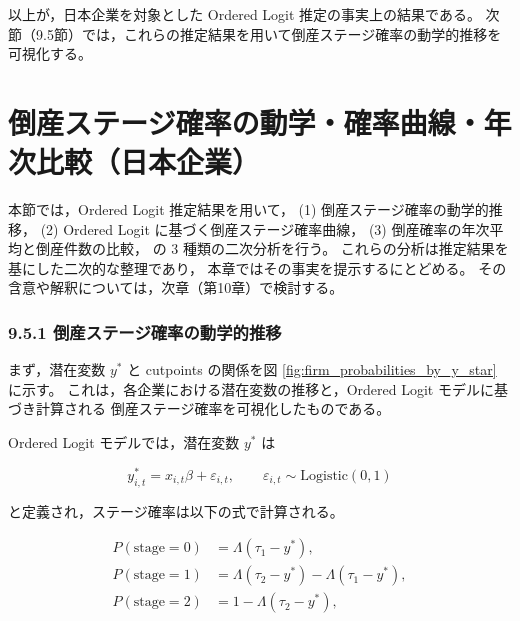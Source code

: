 以上が，日本企業を対象とした Ordered Logit 推定の事実上の結果である。
次節（9.5節）では，これらの推定結果を用いて倒産ステージ確率の動学的推移を可視化する。



\section{倒産ステージ確率の動学・確率曲線・年次比較（日本企業）}

本節では，Ordered Logit 推定結果を用いて，
(1) 倒産ステージ確率の動学的推移，
(2) Ordered Logit に基づく倒産ステージ確率曲線，
(3) 倒産確率の年次平均と倒産件数の比較，
の 3 種類の二次分析を行う。
これらの分析は推定結果を基にした二次的な整理であり，
本章ではその事実を提示するにとどめる。  
その含意や解釈については，次章（第10章）で検討する。


\subsubsection{9.5.1 倒産ステージ確率の動学的推移}

まず，潜在変数 $y^*$ と cutpoints の関係を図 \ref{fig:firm_probabilities_by_y_star} に示す。
これは，各企業における潜在変数の推移と，Ordered Logit モデルに基づき計算される
倒産ステージ確率を可視化したものである。

Ordered Logit モデルでは，潜在変数 $y^*$ は



\[
y^*_{i,t} = x_{i,t}\beta + \varepsilon_{i,t}, \qquad \varepsilon_{i,t}\sim\text{Logistic}(0,1)
\]



と定義され，ステージ確率は以下の式で計算される。



\[
\begin{aligned}
P(\text{stage}=0) &= \Lambda(\tau_1 - y^*),\\
P(\text{stage}=1) &= \Lambda(\tau_2 - y^*) - \Lambda(\tau_1 - y^*),\\
P(\text{stage}=2) &= 1 - \Lambda(\tau_2 - y^*),
\end{aligned}
\]



